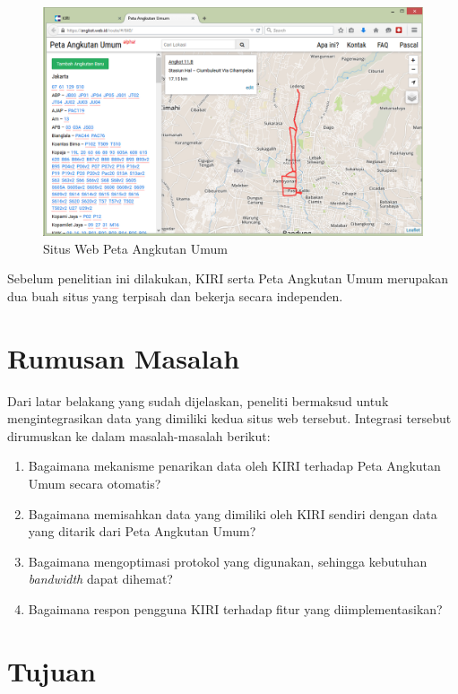 \begin{figure}
	\centering
	\includegraphics[scale=0.5]{Gambar/1_angkotwebid}
	\caption{Situs Web Peta Angkutan Umum}
	\label{fig:1_angkotwebid}
\end{figure}

Sebelum penelitian ini dilakukan, KIRI serta Peta Angkutan Umum merupakan dua buah situs yang terpisah dan bekerja secara independen.

\section{Rumusan Masalah}

Dari latar belakang yang sudah dijelaskan, peneliti bermaksud untuk mengintegrasikan data yang dimiliki kedua situs web tersebut. Integrasi tersebut dirumuskan ke dalam masalah-masalah berikut:

\begin{enumerate}
	\item Bagaimana mekanisme penarikan data oleh KIRI terhadap Peta Angkutan Umum secara otomatis?
	\item Bagaimana memisahkan data yang dimiliki oleh KIRI sendiri dengan data yang ditarik dari Peta Angkutan Umum?
	\item Bagaimana mengoptimasi protokol yang digunakan, sehingga kebutuhan \textit{bandwidth} dapat dihemat?
	\item Bagaimana respon pengguna KIRI terhadap fitur yang diimplementasikan?
\end{enumerate}

\section{Tujuan}

